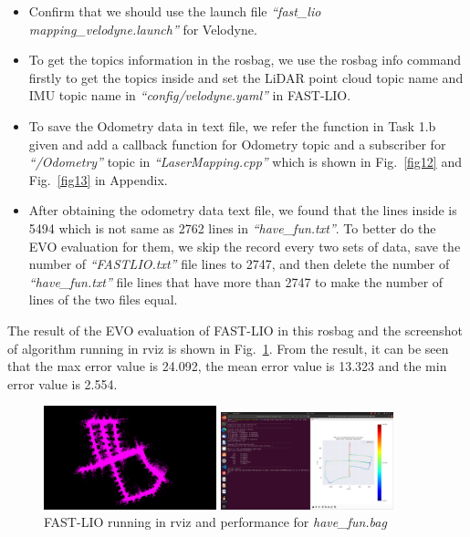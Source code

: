 \documentclass[hyperref]{article}
\theoremstyle{nonumberplain}
\begin{document}
\begin{itemize}[itemsep=3pt,topsep=0pt,parsep=0pt]
	\item Confirm that we should use the launch file \textit{“fast\_lio mapping\_velodyne.launch”} for Velodyne. 
	\item To get the topics information in the rosbag, we use the rosbag info command firstly to get the topics inside and set the LiDAR point cloud topic name and IMU topic name in \textit{“config/velodyne.yaml”} in FAST-LIO.
	\item To save the Odometry data in text file, we refer the function in Task 1.b given and add a callback function for Odometry topic and a subscriber for \textit{“/Odometry”} topic in \textit{“LaserMapping.cpp”} which is shown in Fig.~\ref{fig12} and Fig.~\ref{fig13} in Appendix.
	\item After obtaining the odometry data text file, we found that the lines inside is 5494 which is not same as 2762 lines in \textit{“have\_fun.txt”}. To better do the EVO evaluation for them, we skip the record every two sets of data, save the number of \textit{“FASTLIO.txt”} file lines to 2747, and then delete the number of \textit{“have\_fun.txt”} file lines that have more than 2747 to make the number of lines of the two files equal.
\end{itemize}

The result of the EVO evaluation of FAST-LIO in this rosbag and the screenshot of algorithm running in rviz is shown in Fig.~\ref{fig9}. From the result, it can be seen that the max error value is 24.092, the mean error value is 13.323 and the min error value is 2.554.

\begin{figure}[H]
	\centering
	\begin{minipage}[t]{0.45\textwidth}
		\centering
		\includegraphics[width=5cm]{bonus_rviz.png}
	\end{minipage}
	\begin{minipage}[t]{0.45\textwidth}
		\centering
		\includegraphics[width=5cm]{bonus_result.png}
	\end{minipage}
	\caption{FAST-LIO running in rviz and performance for \textit{have\_fun.bag}}
	\label{fig9}
\end{figure} 
\end{document}
